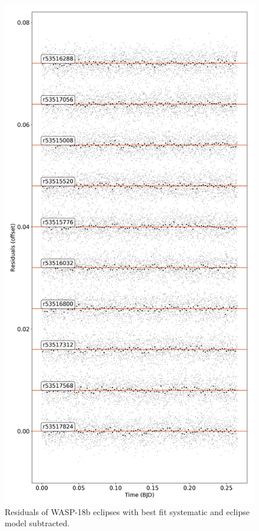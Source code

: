 \begin{subappendices}
\begin{figure}
    \centering
    \includegraphics[height=\textheight]{Residuals_W18b.png}
    \caption{Residuals of WASP-18b eclipses with best fit systematic and eclipse model subtracted.}
    \label{P3:fig:residuallcs}
\end{figure}

\end{subappendices}
